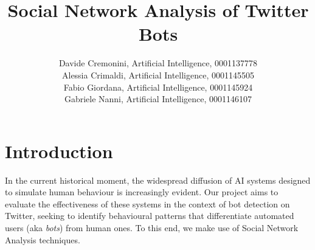 \documentclass[12pt, a4paper]{article}
\author{Davide Cremonini, Artificial Intelligence, 0001137778
\\Alessia Crimaldi, Artificial Intelligence, 0001145505
\\Fabio Giordana, Artificial Intelligence, 0001145924
\\Gabriele Nanni, Artificial Intelligence, 0001146107}
\date{}
\title{Social Network Analysis of Twitter Bots}
\begin{document}
\maketitle










\section{Introduction}
	\label{introduction}
	In the current historical moment, the widespread diffusion of AI systems designed to simulate human behaviour is increasingly evident. Our project aims to evaluate the effectiveness of these systems in the context of bot detection on Twitter, seeking to identify behavioural patterns that differentiate automated users (aka \textit{bots}) from human ones. To this end, we make use of Social Network Analysis techniques.
\end{document}
